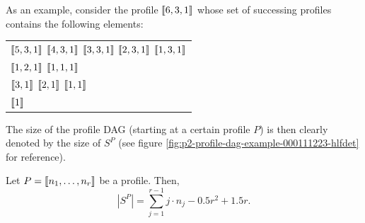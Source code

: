 As an example, consider the profile $\left\llbracket 6,3,1 \right\rrbracket$ whose set of successing profiles contains the following elements:

\begin{center}
  \begin{tabular}{l}
    $\left\llbracket 5,3,1 \right\rrbracket$ \quad $\left\llbracket 4,3,1 \right\rrbracket$ \quad $\left\llbracket 3,3,1 \right\rrbracket$ \quad $\left\llbracket 2,3,1 \right\rrbracket$ \quad $\left\llbracket 1,3,1 \right\rrbracket$ \\
    $\left\llbracket 1,2,1 \right\rrbracket$ \quad $\left\llbracket 1,1,1 \right\rrbracket$ \\
    $\left\llbracket 3,1 \right\rrbracket$ \quad $\left\llbracket 2,1 \right\rrbracket$ \quad $\left\llbracket 1,1 \right\rrbracket$ \\
    $\left\llbracket 1 \right\rrbracket$
  \end{tabular}
\end{center}

The size of the profile DAG (starting at a certain profile $P$) is then clearly denoted by the size of $S^P$ (see figure \ref{fig:p2-profile-dag-example-000111223-hlfdet} for reference).

\begin{lemma}
  \label{lem:profile-dags-exact-size}
  Let $P=\left\llbracket n_1,\dots,n_r \right\rrbracket$ be a profile. Then, 
  \begin{equation*}
    \left| S^P \right| = 
    \sum _{j=1}^{r-1} j \cdot n_j 
    -0.5r^2 + 1.5 r.
  \end{equation*}
\end{lemma}

